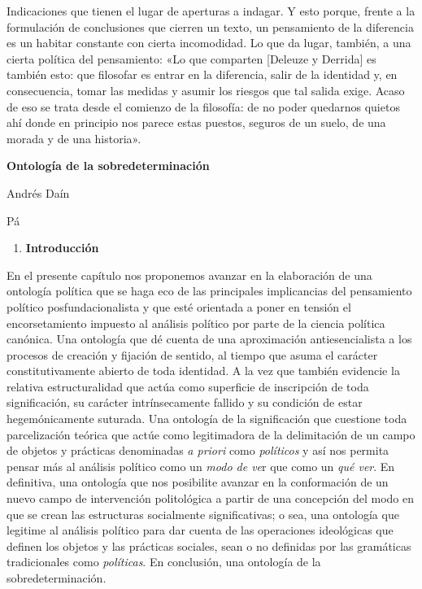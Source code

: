 Indicaciones que tienen el lugar de aperturas a indagar. Y esto porque, frente a la formulación de conclusiones que cierren un texto, un pensamiento de la diferencia es un habitar constante con cierta incomodidad. Lo que da lugar, también, a una cierta política del pensamiento: «Lo que comparten {[}Deleuze y Derrida{]} es también esto: que filosofar es entrar en la diferencia, salir de la identidad y, en consecuencia, tomar las medidas y asumir los riesgos que tal salida exige. Acaso de eso se trata desde el comienzo de la filosofía: de no poder quedarnos quietos ahí donde en principio nos parece estas puestos, seguros de un suelo, de una morada y de una historia».

\textbf{Ontología de la sobredeterminación}

Andrés Daín

Pá

\begin{enumerate}
\def\labelenumi{\arabic{enumi}.}
\item
  \textbf{Introducción}
\end{enumerate}

En el presente capítulo nos proponemos avanzar en la elaboración de una ontología política que se haga eco de las principales implicancias del pensamiento político posfundacionalista y que esté orientada a poner en tensión el encorsetamiento impuesto al análisis político por parte de la ciencia política canónica. Una ontología que dé cuenta de una aproximación antiesencialista a los procesos de creación y fijación de sentido, al tiempo que asuma el carácter constitutivamente abierto de toda identidad. A la vez que también evidencie la relativa estructuralidad que actúa como superficie de inscripción de toda significación, su carácter intrínsecamente fallido y su condición de estar hegemónicamente suturada. Una ontología de la significación que cuestione toda parcelización teórica que actúe como legitimadora de la delimitación de un campo de objetos y prácticas denominadas \emph{a priori} como \emph{políticos} y así nos permita pensar más al análisis político como un \emph{modo de ve}r que como un \emph{qué ver}. En definitiva, una ontología que nos posibilite avanzar en la conformación de un nuevo campo de intervención politológica a partir de una concepción del modo en que se crean las estructuras socialmente significativas; o sea, una ontología que legitime al análisis político para dar cuenta de las operaciones ideológicas que definen los objetos y las prácticas sociales, sean o no definidas por las gramáticas tradicionales como \emph{políticas}. En conclusión, una ontología de la sobredeterminación.

